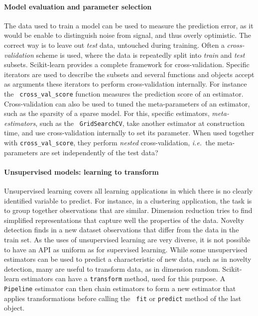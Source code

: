 \documentclass[a4paper]{article}
\begin{document}
\paragraph{Model evaluation and parameter selection}
%
The data used to train a model can be used to measure the prediction
error, as it would be enable to distinguish noise from signal, and thus
overly optimistic. The correct way is to leave out \emph{test} data,
untouched during training. Often a \emph{cross-validation} scheme is
used, where the data is repeatedly split into \emph{train} and
\emph{test} subsets. Scikit-learn provides a complete framework for
cross-validation. Specific iterators are used to describe the subsets and
several functions and objects accept as arguments these iterators to
perform cross-validation internally. For instance the {\tt
cross\_val\_score} function measures the prediction score of an
estimator. Cross-validation can also be used to tuned the meta-parameters
of an estimator, such as the sparsity of a sparse model. For this,
specific estimators, \emph{meta-estimators}, such as the {\tt
GridSearchCV}, take another estimator at construction time, and use
cross-validation internally to set its parameter. When used together with
{\tt cross\_val\_score}, they perform \emph{nested} cross-validation,
\emph{i.e.}~the meta-parameters are set independently of the test data?

\paragraph{Unsupervised models: learning to transform}
%
Unsupervised learning covers all learning applications in which there is
no clearly identified variable to predict. For instance, in a clustering
application, the task is to group together observations that are similar.
Dimension reduction tries to find simplified representations that capture
well the properties of the data. Novelty detection finds in a new dataset
observations that differ from the data in the train set. As the uses of
unsupervised learning are very diverse, it is not possible to have an API
as uniform as for supervised learning. While some unsupervised
estimators can be used to predict a characteristic of new data, such as
in novelty detection, many are useful to transform data, as in dimension
random. Scikit-learn estimators can have a {\tt transform} method, used
for this purpose. A {\tt Pipeline} estimator can then chain estimators to
form a new estimator that applies transformations before calling the {\tt
fit} or {\tt predict} method of the last object.
\end{document}
